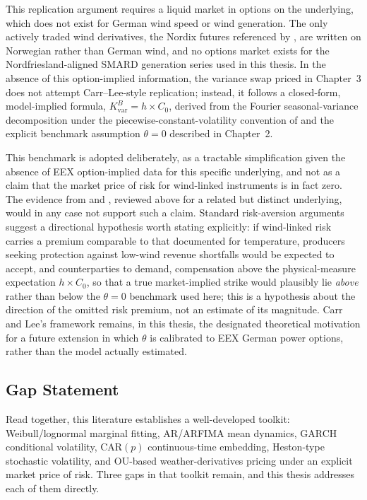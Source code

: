 ﻿\documentclass[11pt, a4paper, twoside]{article}
\begin{document}
This replication argument requires a liquid market in options on the underlying, which does not exist for German wind speed or wind generation. The only actively traded wind derivatives, the Nordix futures referenced by \citet{AlexandridisZapranis2013}, are written on Norwegian rather than German wind, and no options market exists for the Nordfriesland-aligned SMARD generation series used in this thesis. In the absence of this option-implied information, the variance swap priced in Chapter~3 does not attempt Carr--Lee-style replication; instead, it follows a closed-form, model-implied formula, $K_{\text{var}}^B = h \times C_0$, derived from the Fourier seasonal-variance decomposition under the piecewise-constant-volatility convention of \citet{Tol1997} and the explicit benchmark assumption $\theta = 0$ described in Chapter~2.

This benchmark is adopted deliberately, as a tractable simplification given the absence of EEX option-implied data for this specific underlying, and not as a claim that the market price of risk for wind-linked instruments is in fact zero. The evidence from \citet{HardleLopezCabrera2009} and \citet{DorfleitnerWimmer2010}, reviewed above for a related but distinct underlying, would in any case not support such a claim. Standard risk-aversion arguments suggest a directional hypothesis worth stating explicitly: if wind-linked risk carries a premium comparable to that documented for temperature, producers seeking protection against low-wind revenue shortfalls would be expected to accept, and counterparties to demand, compensation above the physical-measure expectation $h \times C_0$, so that a true market-implied strike would plausibly lie \emph{above} rather than below the $\theta = 0$ benchmark used here; this is a hypothesis about the direction of the omitted risk premium, not an estimate of its magnitude. Carr and Lee's framework remains, in this thesis, the designated theoretical motivation for a future extension in which $\theta$ is calibrated to EEX German power options, rather than the model actually estimated.

\subsection{Gap Statement}
\label{sec:lit-gap}

Read together, this literature establishes a well-developed toolkit: Weibull/lognormal marginal fitting, AR/ARFIMA mean dynamics, GARCH conditional volatility, CAR$(p)$ continuous-time embedding, Heston-type stochastic volatility, and OU-based weather-derivatives pricing under an explicit market price of risk. Three gaps in that toolkit remain, and this thesis addresses each of them directly.
\end{document}
